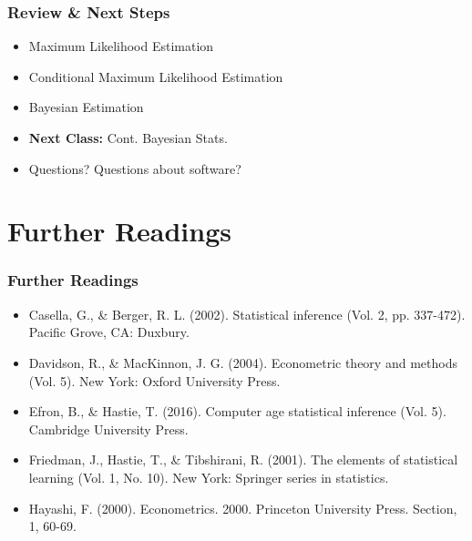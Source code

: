 \documentclass[
  shownotes,
  xcolor={svgnames},
  hyperref={colorlinks,citecolor=DarkBlue,linkcolor=DarkRed,urlcolor=DarkBlue}
  ]{beamer}
\begin{document}
\begin{frame}
\frametitle{Review \& Next Steps}
  
  \begin{itemize} 
    \item Maximum Likelihood Estimation
    \medskip
    \item Conditional Maximum Likelihood Estimation
    \medskip
    \item Bayesian Estimation
  \bigskip  

  
  \item  {\bf Next Class:} Cont. Bayesian Stats.
  \bigskip
  \item Questions? Questions about software? 
  
  \end{itemize}


\end{frame}



\section{Further Readings}
\begin{frame}
\frametitle{Further Readings}
\footnotesize
\begin{itemize}
  \item Casella, G., \& Berger, R. L. (2002). Statistical inference (Vol. 2, pp. 337-472). Pacific Grove, CA: Duxbury.
  \medskip
   \item Davidson, R., \& MacKinnon, J. G. (2004). Econometric theory and methods (Vol. 5). New York: Oxford University Press.
  \medskip
  \item Efron, B., \& Hastie, T. (2016). Computer age statistical inference (Vol. 5). Cambridge University Press.
  \medskip
  \item Friedman, J., Hastie, T., \& Tibshirani, R. (2001). The elements of statistical learning (Vol. 1, No. 10). New York: Springer series in statistics.
  \medskip
  \item Hayashi, F. (2000). Econometrics. 2000. Princeton University Press. Section, 1, 60-69.
  
\end{itemize}

\end{frame}

\end{document}
